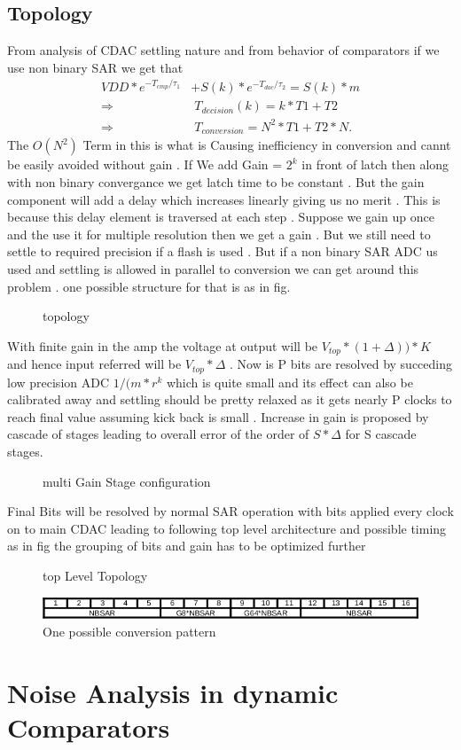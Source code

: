 \documentclass[a4paper,10pt,fleqn,titlepage,twoside]{article}
\begin{document}
\subsection*{Topology}
From analysis of CDAC settling nature and from behavior of comparators if we use non binary SAR we get that 
\begin{align*}
VDD*e^{-T_{cmp}/\tau_1}&+S(k)*e^{-T_{dac}/\tau_2} = S(k)*m\\
\Rightarrow &\;T_{decision}(k) = k*T1+T2\\
\Rightarrow &\;T_{conversion} = N^2*T1+T2*N.
\end{align*}
The $O(N^{2})$ Term in this is what is Causing inefficiency in conversion and cannt be easily avoided without gain . If We add Gain = $2^{k}$ in front
of latch then along with non binary convergance we get latch time to be constant . But the gain component will add a delay which increases linearly 
giving us no merit . This is because this delay element is traversed at each step . Suppose we gain up once and the use it for multiple resolution then
we get a gain . But we still need to settle to required precision if a flash is used . But if a non binary SAR ADC us used and settling is allowed in 
parallel to conversion we can get around this problem . one possible structure for that is as in fig.
\begin{figure}[h]
\centering
\setlength\fboxsep{5.0pt}
\setlength\fboxrule{0.5pt}
\caption{topology}
\label{fig:ampArch}
\end{figure}
With finite gain in the amp the voltage at output will be $V_{top}*(1+\Delta))*K$ and hence input referred will be $V_{top}*\Delta$ . Now is P bits are resolved by succeding low precision ADC
$1/(m*r^{k}$  which is quite small and its effect can also be calibrated away and settling should be pretty relaxed as it gets nearly P clocks to reach final value assuming kick back is small . 
Increase in gain is proposed by cascade of stages leading to overall error of the order of $S*\Delta$  for S cascade stages.
\begin{figure}[h]
\centering
\setlength\fboxsep{5.0pt}
\setlength\fboxrule{0.5pt}
\caption{multi Gain Stage configuration}
\label{fig:ampMulti}
\end{figure}
Final Bits will be resolved by normal SAR operation with bits applied every clock on to main CDAC leading to following top level architecture and possible timing as in fig the grouping of bits and 
gain has to be optimized further
\begin{figure}[htbp]
\centering
\setlength\fboxsep{5.0pt}
\setlength\fboxrule{0.5pt}
\caption{top Level Topology}
\label{fig:topArch}
\end{figure}
\begin{figure}[htb]
\centering
\includegraphics[width=1.0\linewidth]{./img/timing.png}
\caption{One possible conversion pattern}
\label{fig:toptiming}
\end{figure}

\newpage
\newpage
\newpage
\section*{Noise Analysis in dynamic Comparators}
\end{document}
